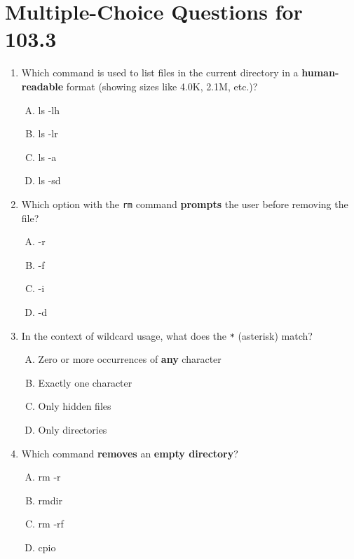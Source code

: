 \documentclass[a4paper]{report}
\begin{document}
\section*{Multiple-Choice Questions for 103.3}
\begin{enumerate}[1.]

    \item Which command is used to list files in the current directory in a \textbf{human-readable} format (showing sizes like 4.0K, 2.1M, etc.)?  
    \begin{enumerate}[A)]
        \item ls -lh  
        \item ls -lr  
        \item ls -a  
        \item ls -sd  
    \end{enumerate}

    \item Which option with the \texttt{rm} command \textbf{prompts} the user before removing the file?  
    \begin{enumerate}[A)]
        \item -r  
        \item -f  
        \item -i  
        \item -d  
    \end{enumerate}

    \item In the context of wildcard usage, what does the \texttt{*} (asterisk) match?  
    \begin{enumerate}[A)]
        \item Zero or more occurrences of \textbf{any} character  
        \item Exactly one character  
        \item Only hidden files  
        \item Only directories  
    \end{enumerate}

    \item Which command \textbf{removes} an \textbf{empty directory}?  
    \begin{enumerate}[A)]
        \item rm -r  
        \item rmdir  
        \item rm -rf  
        \item cpio  
    \end{enumerate}


\end{enumerate}
\end{document}
